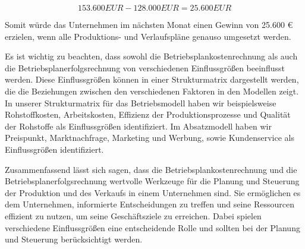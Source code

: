 \[ 153.600 EUR - 128.000 EUR = 25.600 EUR \]

Somit würde das Unternehmen im nächsten Monat einen Gewinn von 25.600 {\euro} erzielen, wenn alle Produktions- und Verlaufspläne genauso umgesetzt werden.

Es ist wichtig zu beachten, dass sowohl die Betriebsplankostenrechnung als auch die Betriebsplanerfolgsrechnung von verschiedenen Einflussgrößen beeinflusst werden. Diese Einflussgrößen können in einer Strukturmatrix dargestellt werden, die die Beziehungen zwischen den verschiedenen Faktoren in den Modellen zeigt. In unserer Strukturmatrix für das Betriebsmodell haben wir beispielsweise Rohstoffkosten, Arbeitskosten, Effizienz der Produktionsprozesse und Qualität der Rohstoffe als Einflussgrößen identifiziert. Im Absatzmodell haben wir Preispunkt, Marktnachfrage, Marketing und Werbung, sowie Kundenservice als Einflussgrößen identifiziert.

Zusammenfassend lässt sich sagen, dass die Betriebsplankostenrechnung und die Betriebsplanerfolgsrechnung wertvolle Werkzeuge für die Planung und Steuerung der Produktion und des Verkaufs in einem Unternehmen sind. Sie ermöglichen es dem Unternehmen, informierte Entscheidungen zu treffen und seine Ressourcen effizient zu nutzen, um seine Geschäftsziele zu erreichen. Dabei spielen verschiedene Einflussgrößen eine entscheidende Rolle und sollten bei der Planung und Steuerung berücksichtigt werden.